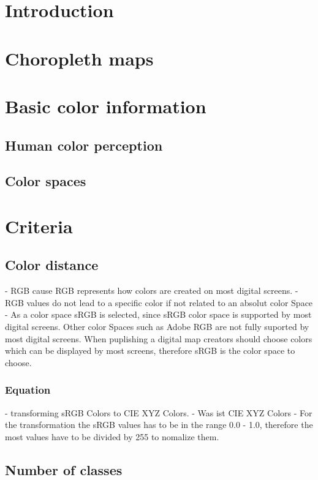 \section{Introduction}

\section{Choropleth maps}

\section{Basic color information}

\subsection{Human color perception}

\subsection{Color spaces}

\section{Criteria}

\subsection{Color distance}

- RGB cause RGB represents how colors are created on most digital screens. 
- RGB values do not lead to a specific color if not related to an absolut color Space
- As a color space sRGB is selected, since sRGB color space is supported by most digital screens. Other color Spaces such as Adobe RGB are not fully suported by most digital screens. When puplishing a digital map creators should choose colors which can be displayed by most screens, therefore sRGB is the color space to choose.

\subsubsection{Equation}
- transforming sRGB Colors to CIE XYZ Colors. 
- Was ist CIE XYZ Colors
- For the transformation the sRGB values has to be in the range 0.0 - 1.0, therefore the most values have to be divided by 255 to nomalize them. 
\subsection{Number of classes}

